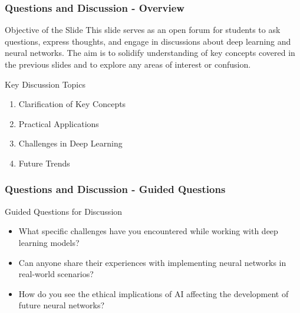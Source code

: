 \documentclass[aspectratio=169]{beamer}
\begin{document}
\begin{frame}[fragile]
  \frametitle{Questions and Discussion - Overview}
  \begin{block}{Objective of the Slide}
    This slide serves as an open forum for students to ask questions, express thoughts, and engage in discussions about deep learning and neural networks. The aim is to solidify understanding of key concepts covered in the previous slides and to explore any areas of interest or confusion.
  \end{block}
  
  \begin{block}{Key Discussion Topics}
    \begin{enumerate}
      \item Clarification of Key Concepts
      \item Practical Applications
      \item Challenges in Deep Learning
      \item Future Trends
    \end{enumerate}
  \end{block}
\end{frame}

\begin{frame}[fragile]
  \frametitle{Questions and Discussion - Guided Questions}
  \begin{block}{Guided Questions for Discussion}
    \begin{itemize}
      \item What specific challenges have you encountered while working with deep learning models?
      \item Can anyone share their experiences with implementing neural networks in real-world scenarios?
      \item How do you see the ethical implications of AI affecting the development of future neural networks?
    \end{itemize}
  \end{block}
\end{frame}
\end{document}
